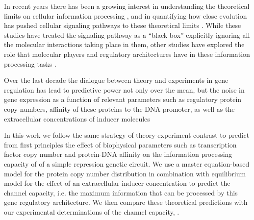 In recent years there has been a growing interest in understanding the
theoretical limits on cellular information processing \cite{Bialek2005,
Gregor2007}, and in quantifying how close evolution has pushed cellular
signaling pathways to these theoretical limits \cite{Tkacik2008, Dubuis2013,
Petkova2016}. While these studies have treated the signaling pathway as a
``black box'' explicitly ignoring all the molecular interactions taking place in
them, other studies have explored the role that molecular players and regulatory
architectures have in these information processing tasks \cite{Rieckh2014,
Ziv2007, Voliotis2014, Tostevin2009, Tkacik2011, Tkacik2008a, Tabbaa2014}.

Over the last decade the dialogue between theory and experiments in gene
regulation has lead to predictive power not only over the mean, but the noise in
gene expression as a function of relevant parameters such as regulatory protein
copy numbers, affinity of these proteins to the DNA promoter, as well as the
extracellular concentrations of inducer molecules\cite{Jones2014a, Brewster2014,
Garcia2011ck, Razo-Mejia2018} 

In this work we follow the same strategy of theory-experiment contrast to
predict from first principles the effect of biophysical parameters such as
transcription factor copy number and protein-DNA affinity on the information
processing capacity of of a simple repression genetic circuit. We use a master
equation-based model for the protein copy number distribution in combination
with equilibrium model for the effect of an extracellular inducer concentration
to predict the channel capacity, i.e. the maximum information that can be
processed by this gene regulatory architecture. We then compare these
theoretical predictions with our experimental determinations of the channel
capacity, .
